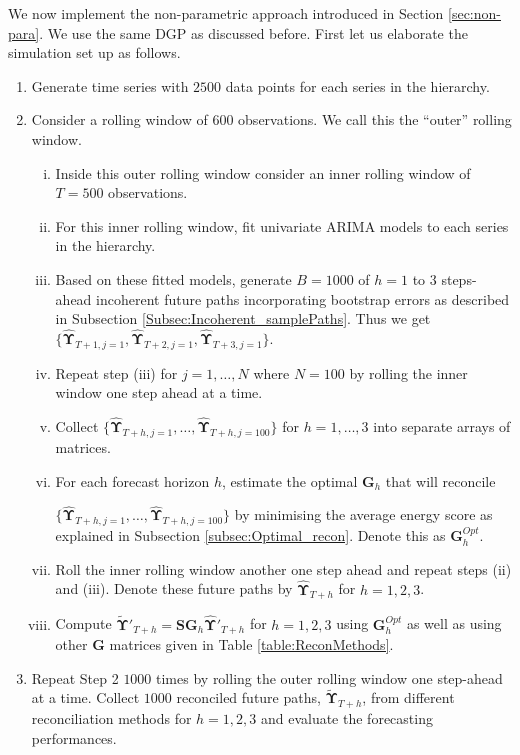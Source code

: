 \documentclass[12pt]{article}
\theoremstyle{definition}
\begin{document}
We now implement the non-parametric approach introduced in Section \ref{sec:non-para}.
We use the same DGP as discussed before. First let us elaborate the simulation set up as follows.   

\begin{enumerate}
	\item Generate time series with $2500$ data points for each series in the hierarchy.
	
	\item Consider a rolling window of $600$ observations. We call this the ``outer'' rolling window.
	\begin{enumerate}[i.]
		\item Inside this outer rolling window consider an inner rolling window of $T=500$ observations.
		\item For this inner rolling window, fit univariate ARIMA models to each series in the hierarchy.
		\item Based on these fitted models, generate $B=1000$ of $h=1$ to $3$ steps-ahead incoherent future paths incorporating bootstrap errors as described in Subsection \ref{Subsec:Incoherent_samplePaths}. Thus we get $\{\hat{\bm{\Upsilon}}_{T+1,j=1}, \hat{\bm{\Upsilon}}_{T+2,j=1}, \hat{\bm{\Upsilon}}_{T+3,j=1}\}$.
		\item Repeat step (iii) for $j=1,\dots,N$ where $N=100$ by rolling the inner window one step ahead at a time.
		\item Collect $\{\hat{\bm{\Upsilon}}_{T+h,j=1},\dots,\hat{\bm{\Upsilon}}_{T+h,j=100}\}$ for $h=1,\dots,3$ into separate arrays of matrices.
		\item For each forecast horizon $h$, estimate the optimal $\bm{G}_h$ that will reconcile
		
		$\{\hat{\bm{\Upsilon}}_{T+h,j=1},\dots,\hat{\bm{\Upsilon}}_{T+h,j=100}\}$ by minimising the average energy score as explained in Subsection \ref{subsec:Optimal_recon}. Denote this as $\bm{G}^{Opt}_h$.
		
		\item Roll the inner rolling window another one step ahead and repeat steps (ii) and (iii). Denote these future paths by $\hat{\bm{\Upsilon}}_{T+h}$ for $h=1,2,3$.
		\item Compute $\tilde{\bm{\Upsilon}}'_{T+h} = \bm{SG}_h\hat{\bm{\Upsilon}}'_{T+h}$ for $h=1,2,3$ using $\bm{G}^{Opt}_h$ as well as using other $\bm{G}$ matrices given in Table \ref{table:ReconMethods}.
		
	\end{enumerate}
	
	\item Repeat Step 2 $1000$ times by rolling the outer rolling window one step-ahead at a time. Collect $1000$ reconciled future paths, $\tilde{\bm{\Upsilon}}_{T+h}$, from different reconciliation methods for $h=1,2,3$ and evaluate the forecasting performances.
\end{enumerate}
\end{document}
